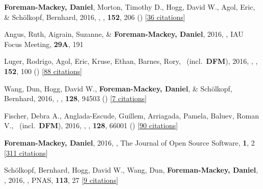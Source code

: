 \item[{\color{numcolor}\scriptsize22}] \textbf{Foreman-Mackey, Daniel}, Morton, Timothy D., Hogg, David W., Agol, Eric, \& Sch{\"o}lkopf, Bernhard, 2016, , \aj, \textbf{152}, 206 () [\href{http://adsabs.harvard.edu/abs/2016AJ....152..206F}{36 citations}]

\item[{\color{numcolor}\scriptsize21}] Angus, Ruth, Aigrain, Suzanne, \& \textbf{Foreman-Mackey, Daniel}, 2016, , IAU Focus Meeting, \textbf{29A}, 191

\item[{\color{numcolor}\scriptsize20}] Luger, Rodrigo, Agol, Eric, Kruse, Ethan, Barnes, Rory, \etal\ (incl.\ \textbf{DFM}), 2016, , \aj, \textbf{152}, 100 () [\href{http://adsabs.harvard.edu/abs/2016AJ....152..100L}{88 citations}]

\item[{\color{numcolor}\scriptsize19}] Wang, Dun, Hogg, David W., \textbf{Foreman-Mackey, Daniel}, \& Sch{\"o}lkopf, Bernhard, 2016, , \pasp, \textbf{128}, 94503 () [\href{http://adsabs.harvard.edu/abs/2016PASP..128i4503W}{7 citations}]

\item[{\color{numcolor}\scriptsize18}] Fischer, Debra A., Anglada-Escude, Guillem, Arriagada, Pamela, Baluev, Roman V., \etal\ (incl.\ \textbf{DFM}), 2016, , \pasp, \textbf{128}, 66001 () [\href{http://adsabs.harvard.edu/abs/2016PASP..128f6001F}{90 citations}]

\item[{\color{numcolor}\scriptsize17}] \textbf{Foreman-Mackey, Daniel}, 2016, , The Journal of Open Source Software, \textbf{1}, 2 [\href{https://scholar.google.com/scholar?cites=1835087844145558435,9294978791003210998,17836006976722650130,12820425635803494730}{311 citations}]

\item[{\color{numcolor}\scriptsize16}] Sch{\"o}lkopf, Bernhard, Hogg, David W., Wang, Dun, \textbf{Foreman-Mackey, Daniel}, \etal, 2016, , PNAS, \textbf{113}, 27 [\href{https://scholar.google.com/scholar?cites=2429561747341807338}{9 citations}]

